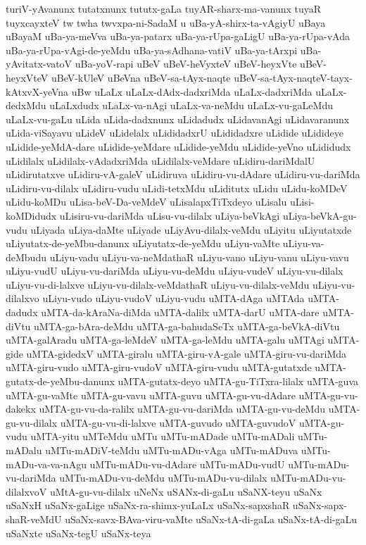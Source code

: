 {turiV-yAvanunx
tutatxnunx
tututx-gaLa
tuyAR-sharx-ma-vanunx
tuyaR
tuyxcayxteV
tw
twha
twvxpa-ni-SadaM
u
uBa-yA-shirx-ta-vAgiyU
uBaya
uBayaM
uBa-ya-meVva
uBa-ya-patarx
uBa-ya-rUpa-gaLigU
uBa-ya-rUpa-vAda
uBa-ya-rUpa-vAgi-de-yeMdu
uBa-ya-sAdhana-vatiV
uBa-ya-tArxpi
uBa-yAvitatx-vatoV
uBa-yoV-rapi
uBeV
uBeV-heVyxteV
uBeV-heyxVte
uBeV-heyxVteV
uBeV-kUleV
uBeVna
uBeV-sa-tAyx-naqte
uBeV-sa-tAyx-naqteV-tayx-kAtxvX-yeVna
uBw
uLaLx
uLaLx-dAdx-dadxriMda
uLaLx-dadxriMda
uLaLx-dedxMdu
uLaLxdudx
uLaLx-va-nAgi
uLaLx-va-neMdu
uLaLx-vu-gaLeMdu
uLaLx-vu-gaLu
uLida
uLida-dadxnunx
uLidadudx
uLidavanAgi
uLidavaranunx
uLida-viSayavu
uLideV
uLidelalx
uLididadxrU
uLididadxre
uLidide
uLidideye
uLidide-yeMdA-dare
uLidide-yeMdare
uLidide-yeMdu
uLidide-yeVno
uLididudx
uLidilalx
uLidilalx-vAdadxriMda
uLidilalx-veMdare
uLidiru-dariMdalU
uLidirutatxve
uLidiru-vA-galeV
uLidiruva
uLidiru-vu-dAdare
uLidiru-vu-dariMda
uLidiru-vu-dilalx
uLidiru-vudu
uLidi-tetxMdu
uLiditutx
uLidu
uLidu-koMDeV
uLidu-koMDu
uLisa-beV-Da-veMdeV
uLisalapxTiTxdeyo
uLisalu
uLisi-koMDidudx
uLisiru-vu-dariMda
uLisu-vu-dilalx
uLiya-beVkAgi
uLiya-beVkA-gu-vudu
uLiyada
uLiya-daMte
uLiyade
uLiyAvu-dilalx-veMdu
uLiyitu
uLiyutatxde
uLiyutatx-de-yeMbu-danunx
uLiyutatx-de-yeMdu
uLiyu-vaMte
uLiyu-va-deMbudu
uLiyu-vadu
uLiyu-va-neMdathaR
uLiyu-vano
uLiyu-vanu
uLiyu-vavu
uLiyu-vudU
uLiyu-vu-dariMda
uLiyu-vu-deMdu
uLiyu-vudeV
uLiyu-vu-dilalx
uLiyu-vu-di-lalxve
uLiyu-vu-dilalx-veMdathaR
uLiyu-vu-dilalx-veMdu
uLiyu-vu-dilalxvo
uLiyu-vudo
uLiyu-vudoV
uLiyu-vudu
uMTA-dAga
uMTAda
uMTA-dadudx
uMTA-da-kAraNa-diMda
uMTA-dalilx
uMTA-darU
uMTA-dare
uMTA-diVtu
uMTA-ga-bAra-deMdu
uMTA-ga-bahudaSeTx
uMTA-ga-beVkA-diVtu
uMTA-galAradu
uMTA-ga-leMdeV
uMTA-ga-leMdu
uMTA-galu
uMTAgi
uMTA-gide
uMTA-gidedxV
uMTA-giralu
uMTA-giru-vA-gale
uMTA-giru-vu-dariMda
uMTA-giru-vudo
uMTA-giru-vudoV
uMTA-giru-vudu
uMTA-gutatxde
uMTA-gutatx-de-yeMbu-danunx
uMTA-gutatx-deyo
uMTA-gu-TiTxra-lilalx
uMTA-guva
uMTA-gu-vaMte
uMTA-gu-vavu
uMTA-guvu
uMTA-gu-vu-dAdare
uMTA-gu-vu-dakekx
uMTA-gu-vu-da-ralilx
uMTA-gu-vu-dariMda
uMTA-gu-vu-deMdu
uMTA-gu-vu-dilalx
uMTA-gu-vu-di-lalxve
uMTA-guvudo
uMTA-guvudoV
uMTA-gu-vudu
uMTA-yitu
uMTeMdu
uMTu
uMTu-mADade
uMTu-mADali
uMTu-mADalu
uMTu-mADiV-teMdu
uMTu-mADu-vAga
uMTu-mADuva
uMTu-mADu-va-va-nAgu
uMTu-mADu-vu-dAdare
uMTu-mADu-vudU
uMTu-mADu-vu-dariMda
uMTu-mADu-vu-deMdu
uMTu-mADu-vu-dilalx
uMTu-mADu-vu-dilalxvoV
uMtA-gu-vu-dilalx
uNeNx
uSANx-di-gaLu
uSaNX-teyu
uSaNx
uSaNxH
uSaNx-gaLige
uSaNx-ra-shimx-yuLaLx
uSaNx-sapxshaR
uSaNx-sapx-shaR-veMdU
uSaNx-savx-BAva-viru-vaMte
uSaNx-tA-di-gaLa
uSaNx-tA-di-gaLu
uSaNxte
uSaNx-tegU
uSaNx-teya
}
